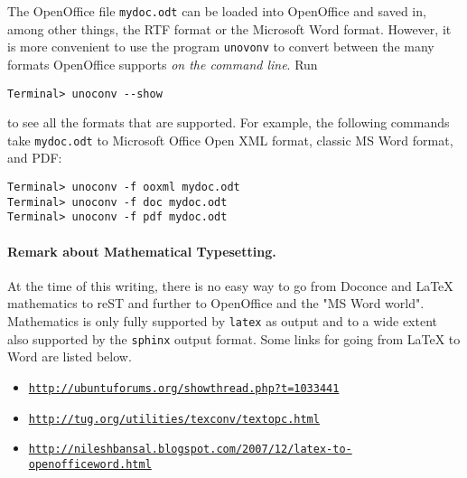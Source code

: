 \documentclass[twoside]{article}
\begin{document}
The OpenOffice file {\fontsize{10pt}{10pt}\verb!mydoc.odt!} can be loaded into OpenOffice and
saved in, among other things, the RTF format or the Microsoft Word format.
However, it is more convenient to use the program {\fontsize{10pt}{10pt}\verb!unovonv!}
to convert between the many formats OpenOffice supports \emph{on the command line}.
Run
\vspace{4pt}
\begin{Verbatim}[numbers=none,frame=lines,label=\fbox{{\tiny Terminal}},fontsize=\fontsize{9pt}{9pt},
labelposition=topline,framesep=2.5mm,framerule=0.7pt]
Terminal> unoconv --show
\end{Verbatim}
to see all the formats that are supported.
For example, the following commands take
{\fontsize{10pt}{10pt}\verb!mydoc.odt!} to Microsoft Office Open XML format,
classic MS Word format, and PDF:
\vspace{4pt}
\begin{Verbatim}[numbers=none,frame=lines,label=\fbox{{\tiny Terminal}},fontsize=\fontsize{9pt}{9pt},
labelposition=topline,framesep=2.5mm,framerule=0.7pt]
Terminal> unoconv -f ooxml mydoc.odt
Terminal> unoconv -f doc mydoc.odt
Terminal> unoconv -f pdf mydoc.odt
\end{Verbatim}

\paragraph{Remark about Mathematical Typesetting.}
At the time of this writing, there is no easy way to go from Doconce
and {\LaTeX} mathematics to reST and further to OpenOffice and the
"MS Word world". Mathematics is only fully supported by {\fontsize{10pt}{10pt}\verb!latex!} as
output and to a wide extent also supported by the {\fontsize{10pt}{10pt}\verb!sphinx!} output format.
Some links for going from {\LaTeX} to Word are listed below.

\begin{itemize}
 \item \href{{http://ubuntuforums.org/showthread.php?t=1033441}}{\nolinkurl{http://ubuntuforums.org/showthread.php?t=1033441}}

 \item \href{{http://tug.org/utilities/texconv/textopc.html}}{\nolinkurl{http://tug.org/utilities/texconv/textopc.html}}

 \item \href{{http://nileshbansal.blogspot.com/2007/12/latex-to-openofficeword.html}}{\nolinkurl{http://nileshbansal.blogspot.com/2007/12/latex-to-openofficeword.html}}
\end{itemize}
\end{document}
